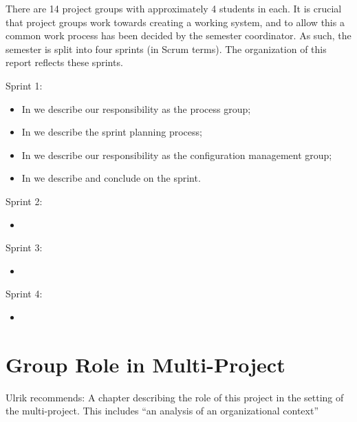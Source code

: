 There are 14 project groups with approximately 4 students in each. It is crucial that project groups work towards creating a working system, and to allow this a common work process has been decided by the semester coordinator. As such, the semester is split into four sprints (in Scrum terms). 
The organization of this report reflects these sprints. 

\begin{documentorganization}
  \item Sprint 1:
  \begin{itemize}
    \item In  we describe our responsibility as the process group;
    \item In  we describe the sprint planning process;
    \item In  we describe our responsibility as the configuration management group;
    \item In  we describe and conclude on the sprint. 
  \end{itemize}
  \item Sprint 2:
  \begin{itemize}
    \item {}
  \end{itemize}
  \item Sprint 3:
  \begin{itemize}
    \item {}
  \end{itemize}
  \item Sprint 4:
  \begin{itemize}
    \item {}
  \end{itemize}
\end{documentorganization}

\section{Group Role in Multi-Project}
Ulrik recommends: A chapter describing the role of this project in the setting of the multi-project. This includes ``an analysis of an organizational context''